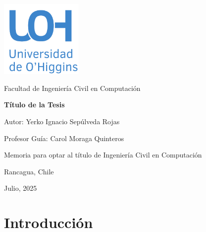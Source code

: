 \documentclass[12pt,a4paper]{report}
\begin{document}
\begin{titlepage}
    \centering
    {\includegraphics[width=0.3\textwidth]{data/logo.png}\par}
    


    {\Large\sffamily\textcolor{uoh}{Facultad de Ingeniería Civil en Computación}\par}
    \vspace{3cm}
    {\huge\bfseries Título de la Tesis \par}
    \vspace{5cm}

    {\normalsize Autor: Yerko Ignacio Sepúlveda Rojas \par}
    {\normalsize Profesor Guía: Carol Moraga Quinteros \par}
    \vspace{4cm}
    {\normalsize Memoria para optar al título de Ingeniería Civil en Computación \par}
    \vfill
    {\normalsize Rancagua, Chile \par}
    {\normalsize Julio, 2025 \par}
\end{titlepage}
\tableofcontents
\listoffigures
\listoftables

\clearpage
{} %

\chapter*{Introducción}
\setcounter{page}{1}   %
\end{document}
